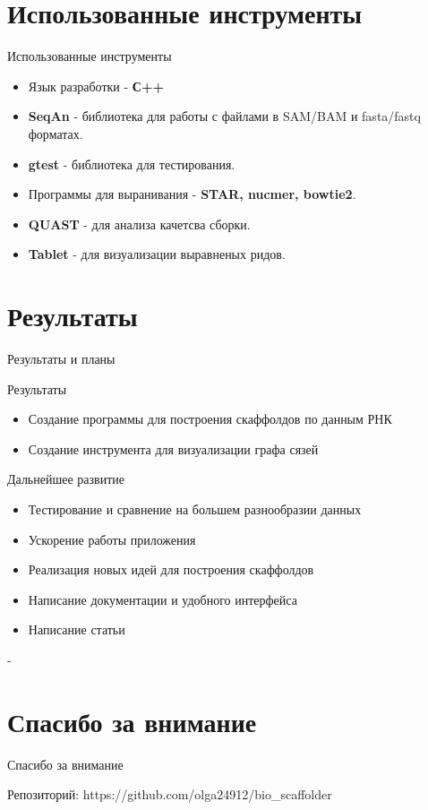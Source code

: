 \documentclass{beamer}
\begin{document}
\section{Использованные инструменты}
\begin{frame}[t]{Использованные инструменты}
	\begin{itemize}
		\item Язык разработки - \textbf{С++}
		\item \textbf{SeqAn} - библиотека для работы с 
		файлами в SAM/BAM и fasta/fastq форматах.  
		\item \textbf{gtest} - библиотека для тестирования.
		\item Программы для выранивания - \textbf{STAR, nucmer, bowtie2}. 
		\item \textbf{QUAST} - для анализа качетсва сборки. 
		\item \textbf{Tablet} - для визуализации выравненых ридов. 
	\end{itemize}
\end{frame}

\section{Результаты}
\begin{frame}[t]{Результаты и планы}
	\begin{block}{Результаты}
		\begin{itemize}
			\item Создание программы для построения скаффолдов по данным РНК 
			\item Создание инструмента для визуализации графа сязей%
		\end{itemize}
	\end{block}
	\begin{block}{Дальнейшее развитие}
		\begin{itemize}
			\item Тестирование и сравнение на большем разнообразии данных
			\item Ускорение работы приложения  
			\item Реализация новых идей для построения скаффолдов 
			\item Написание документации и удобного интерфейса
			\item Написание статьи
			\end{itemize}-
	\end{block}
\end{frame}


\section{Спасибо за внимание}
\begin{frame}{Спасибо за внимание}
    \begin{center}
        Репозиторий: https://github.com/olga24912/bio\_scaffolder
    \end{center}
\end{frame}
\end{document}
